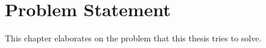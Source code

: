 \chapter{Problem Statement}
\label{cha:problem_statement}

This chapter elaborates on the problem that this thesis tries to solve.
